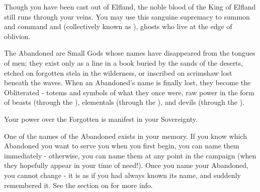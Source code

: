 \begin{multicols*}{2}






  Though you have been cast out of Elfland, the noble blood of the King of Elfland still runs through your veins.  You may use this sanguine supremacy to summon and command  and  (collectively known as  ), ghosts who live at the edge of oblivion.

The Abandoned are Small Gods whose names have disappeared from the tongues of men; they exist only as a line in a book buried by the sands of the deserts, etched on forgotten stela in the wilderness, or inscribed on scrimshaw lost beneath the waves.  When an Abandoned's name is finally lost, they become the Obliterated - totems and symbols of what they once were, raw power in the form of beasts (through the ), elementals (through the ), and devils (through the ).


Your power over the Forgotten is manifest in your Sovereignty.  

  


  One of the names of the Abandoned exists in your memory. If you know which Abandoned you want to serve you when you first begin, you can name them immediately - otherwise, you can name them at any point in the campaign (when they hopefully appear in your time of need!). Once you name your Abandoned, you cannot change - it is as if you had always known its name, and suddenly remembered it. See the section on  for more info.


\end{multicols*}
